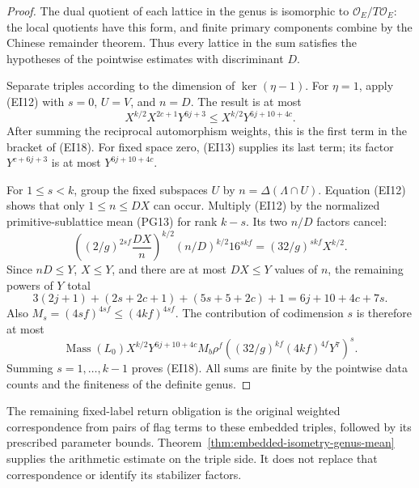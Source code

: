 \begin{proof}
The dual quotient of each lattice in the genus is
isomorphic to \(\mathcal O_E/T\mathcal O_E\): the
local quotients have this form, and finite primary
components combine by the Chinese remainder theorem.
Thus every lattice in the sum satisfies the hypotheses
of the pointwise estimates with discriminant \(D\).

Separate triples according to the dimension of
\(\ker(\eta-1)\).  For \(\eta=1\), apply (EI12) with
\(s=0\), \(U=V\), and \(n=D\).  The result is at most
\[
 X^{k/2}X^{2c+1}Y^{6j+3}
                   \leq X^{k/2}Y^{6j+10+4c}.
\]
After summing the reciprocal automorphism weights,
this is the first term in the bracket of (EI18).
For fixed space zero, (EI13) supplies its last term;
its factor \(Y^{c+6j+3}\) is at most
\(Y^{6j+10+4c}\).

For \(1\leq s<k\), group the fixed subspaces \(U\) by
\(n=\Delta(\Lambda\cap U)\).  Equation (EI12) shows
that only \(1\leq n\leq DX\) can occur.  Multiply
(EI12) by the normalized primitive-sublattice mean
(PG13) for rank \(k-s\).  Its two \(n/D\) factors
cancel:
\[
 \left((2/g)^{2sf}\frac{DX}{n}\right)^{k/2}
                (n/D)^{k/2}16^{skf}
                         =(32/g)^{skf}X^{k/2}.
\]
Since \(nD\leq Y\), \(X\leq Y\), and there are at
most \(DX\leq Y\) values of \(n\), the remaining
powers of \(Y\) total
\[
 3(2j+1)+(2s+2c+1)+(5s+5+2c)+1
                          =6j+10+4c+7s.
\]
Also \(M_s=(4sf)^{4sf}\leq(4kf)^{4sf}\).
The contribution of codimension \(s\) is therefore
at most
\[
 \operatorname{Mass}(L_0)X^{k/2}Y^{6j+10+4c}
 M_b\rho^f
       \left((32/g)^{kf}(4kf)^{4f}Y^7\right)^s.
\]
Summing \(s=1,\ldots,k-1\) proves (EI18).
All sums are finite by the pointwise data counts and
the finiteness of the definite genus.
\end{proof}

The remaining fixed-label return obligation is the original
weighted correspondence from pairs of flag terms to these
embedded triples, followed by its prescribed parameter bounds.
Theorem~\ref{thm:embedded-isometry-genus-mean} supplies the
arithmetic estimate on the triple side.  It does not replace
that correspondence or identify its stabilizer factors.
